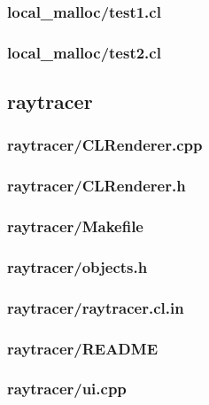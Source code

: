 \documentclass{article}
\begin{document}
\subsubsection*{local\_malloc/test1.cl}


\subsubsection*{local\_malloc/test2.cl}


\subsection{raytracer}
\subsubsection*{raytracer/CLRenderer.cpp}


\subsubsection*{raytracer/CLRenderer.h}


\subsubsection*{raytracer/Makefile}


\subsubsection*{raytracer/objects.h}


\subsubsection*{raytracer/raytracer.cl.in}


\subsubsection*{raytracer/README}


\subsubsection*{raytracer/ui.cpp}

\end{document}

